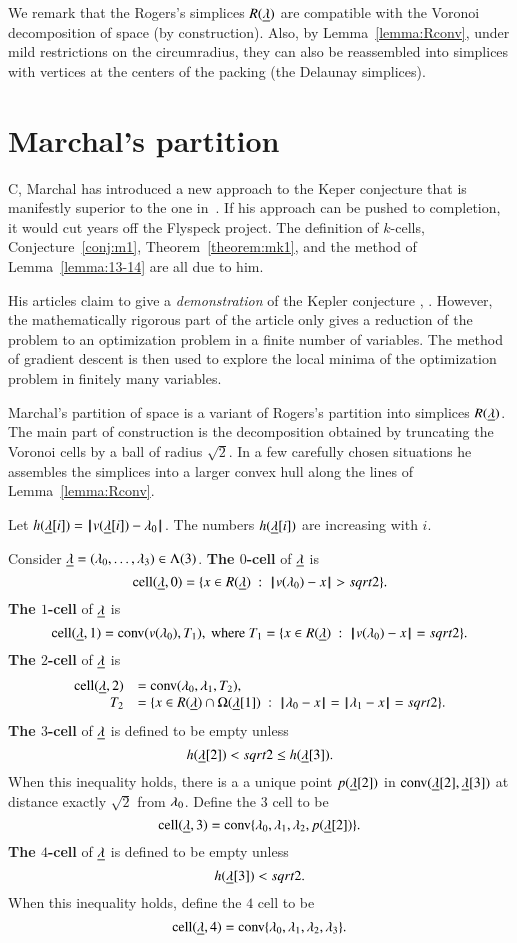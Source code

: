 We remark that the Rogers's simplices $R({\underline{\lambda}})$ are compatible with the Voronoi
decomposition of space (by construction).  Also, by Lemma~\ref{lemma:Rconv}, under
mild restrictions on the circumradius, they can also be reassembled into simplices
with vertices at the centers of the packing (the Delaunay simplices).  

\section{Marchal's partition}

C, Marchal has introduced a new approach to the Keper conjecture that is manifestly superior to the one in~\cite{Hales:2006:DCG}.  If his approach can be pushed
to completion, it would cut years off the Flyspeck project.  The definition of $k$-cells, Conjecture~\ref{conj:m1}, Theorem~\ref{theorem:mk1}, and the method of Lemma~\ref{lemma:13-14} are all due to him.

His articles claim to give
a {\it demonstration} of the Kepler conjecture \cite{marchal:2007}, \cite{marchal:2008}.  However, the
mathematically rigorous part of the article only gives a reduction
of the problem to an optimization problem in a finite number of
variables.  The method of gradient descent is then used to explore
the local minima of the optimization problem in finitely many variables.

Marchal's partition of space is a variant of Rogers's partition into simplices
$R({\underline{\lambda}})$.  The main part of construction is 
the decomposition obtained by truncating the Voronoi cells
by a ball of radius $\sqrt2$.  In a few carefully chosen situations he assembles the simplices
into a larger convex hull along the lines of Lemma~\ref{lemma:Rconv}.

Let $h({\underline{\lambda}}[i]) = {\hskip0.1em|\hskip-0.15em|\hskip0.1em}v({\underline{\lambda}}[i]) - \lambda_0{\hskip0.1em|\hskip-0.15em|\hskip0.1em}$.  The numbers $h({\underline{\lambda}}[i])$ are increasing with $i$.

\begin{definition} Consider ${\underline{\lambda}}=(\lambda_0,\ldots,\lambda_3)\in \Lambda(3)$.
\hfill\break\smallskip  
{\bf The $0$-cell} of ${\underline{\lambda}}$ is
$$
\operatorname{cell}({\underline{\lambda}},0) = \{x\in R({\underline{\lambda}}) \ :\  {\hskip0.1em|\hskip-0.15em|\hskip0.1em}v(\lambda_0) - x{\hskip0.1em|\hskip-0.15em|\hskip0.1em} > sqrt2\}.
$$
\bigskip
{\bf The $1$-cell} of ${\underline{\lambda}}$ is 
$$
\operatorname{cell}({\underline{\lambda}},1) = {\operatorname{conv}}(v(\lambda_0),T_1),\hbox{ where } T_1 = \{x \in R({\underline{\lambda}}) \ :\  {\hskip0.1em|\hskip-0.15em|\hskip0.1em}v(\lambda_0) - x{\hskip0.1em|\hskip-0.15em|\hskip0.1em}= sqrt2\}.
$$
\bigskip
{\bf The $2$-cell} of ${\underline{\lambda}}$ is
$$
\begin{array}{rll}
\operatorname{cell}({\underline{\lambda}},2) &= {\operatorname{conv}}(\lambda_0,\lambda_1,T_2),\quad \\
  T_2 &= \{x \in R({\underline{\lambda}})\cap \Omega({\underline{\lambda}}[1]) \ :\  {\hskip0.1em|\hskip-0.15em|\hskip0.1em}\lambda_0 - x{\hskip0.1em|\hskip-0.15em|\hskip0.1em}={\hskip0.1em|\hskip-0.15em|\hskip0.1em}\lambda_1 - x{\hskip0.1em|\hskip-0.15em|\hskip0.1em} =sqrt2\}.
\end{array}
$$
\bigskip
{\bf The $3$-cell} of ${\underline{\lambda}}$ is defined to be empty unless 
$$
h({\underline{\lambda}}[2]) <sqrt2 \le h({\underline{\lambda}}[3]).
$$
When this inequality holds,
there is a a unique point $p({\underline{\lambda}}[2])$ in
${\operatorname{conv}}({\underline{\lambda}}[2],{\underline{\lambda}}[3])$ at distance exactly $\sqrt2$ from $\lambda_0$.  
Define the $3$ cell to be
$$
\operatorname{cell}({\underline{\lambda}},3) = {\operatorname{conv}}\{\lambda_0,\lambda_1,\lambda_2,p({\underline{\lambda}}[2])\}.
$$
\bigskip
{\bf The $4$-cell} of ${\underline{\lambda}}$ is defined to be empty unless
$$
h({\underline{\lambda}}[3]) <sqrt2.
$$
When this inequality holds, define the $4$ cell to be
$$
\operatorname{cell}({\underline{\lambda}},4) = {\operatorname{conv}}\{\lambda_0,\lambda_1,\lambda_2,\lambda_3\}.
$$
\end{definition}

